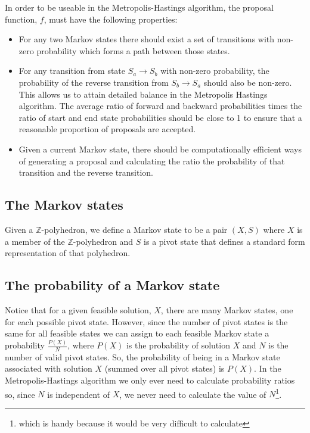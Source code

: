 \documentclass{article}
\begin{document}
In order to be useable in the Metropolis-Hastings algorithm, the proposal function, $f$, must have the following properties:
\begin{itemize}
	\item For any two Markov states there should exist a set of transitions with non-zero probability which forms a path between those states.
	
	\item For any transition from state $S_a \to S_b$ with non-zero probability, the probability of the reverse transition from $S_b \to S_a$ should also be non-zero. This allows us to attain detailed balance in the Metropolis Hastings algorithm. The average ratio of forward and backward probabilities times the ratio of start and end state probabilities should be close to 1 to ensure that a reasonable proportion of proposals are accepted.
	
	\item Given a current Markov state, there should be computationally efficient ways of generating a proposal and calculating the ratio the probability of that transition and the reverse transition. 
\end{itemize}


\subsection{The Markov states}

Given a $\mathbb{Z}$-polyhedron, we define a Markov state to be a pair $(X,S)$ where $X$ is a member of the $\mathbb{Z}$-polyhedron and $S$ is a pivot state that defines a standard form representation of that polyhedron.

\subsection{The probability of a Markov state}

Notice that for a given feasible solution, $X$, there are many Markov states, one for each possible pivot state. However, since the number of pivot states is the same for all feasible states we can assign to each feasible Markov state a probability $\frac{P(X)}{N}$, where $P(X)$ is the probability of solution $X$ and $N$ is the number of valid pivot states. So, the probability of being in a Markov state associated with solution $X$ (summed over all pivot states) is $P(X)$. In the Metropolis-Hastings algorithm we only ever need to calculate probability ratios so, since $N$ is independent of $X$, we never need to calculate the value of $N$\footnote{which is handy because it would be very difficult to calculate}.
\end{document}
